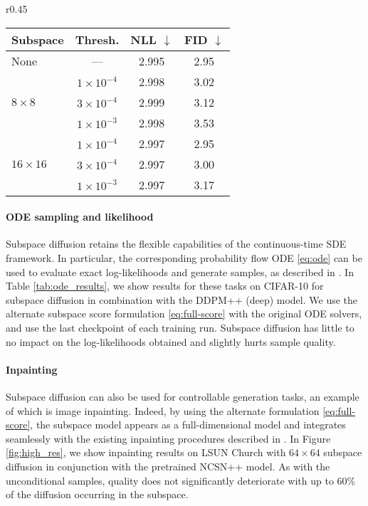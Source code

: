 \documentclass{article}
\begin{document}
\begin{wraptable}[13]{r}{0.45\textwidth}
    \vspace{-12pt}
    \small \begin{tabular}{lccc}
    \toprule
    Subspace               & Thresh. & NLL $\downarrow$   & FID $\downarrow$   \\ \midrule
    None & --- & 2.995 & 2.95 \\ \midrule
    \multirow{3}{*}{$8\times 8$} 
    & $1 \times 10^{-4}$ & 2.998 & 3.02 \\
    & $3 \times 10^{-4}$ & 2.999 & 3.12 \\
    & $1 \times 10^{-3}$ & 2.998 & 3.53 \\ \midrule
    \multirow{3}{*}{$16\times 16$} 
    & $1 \times 10^{-4}$ & 2.997 & 2.95 \\
    & $3 \times 10^{-4}$ & 2.997 & 3.00 \\
    & $1 \times 10^{-3}$ & 2.997 & 3.17 \\ \bottomrule
    \end{tabular}
    \caption{ODE sampling and NLL evaluation on CIFAR-10 from DDPM++ (deep) with subspace diffusion.}
    \label{tab:ode_results}
\end{wraptable}
\paragraph{\textbf{ODE sampling and likelihood}} Subspace diffusion retains the flexible capabilities of the continuous-time SDE framework. In particular, the corresponding probability flow ODE \eqref{eq:ode} can be used to evaluate exact log-likelihoods and generate samples, as described in \cite{song2021score}. In Table \ref{tab:ode_results}, we show results for these tasks on CIFAR-10 for subspace diffusion in combination with the DDPM++ (deep) model. We use the alternate subspace score formulation \eqref{eq:full-score} with the original ODE solvers, and use the last checkpoint of each training run. Subspace diffusion has little to no impact on the log-likelihoods obtained and slightly hurts sample quality.


\paragraph{\textbf{Inpainting}} Subspace diffusion can also be used for controllable generation tasks, an example of which is image inpainting. Indeed, by using the alternate formulation \eqref{eq:full-score}, the subspace model appears as a full-dimensional model and integrates seamlessly with the existing inpainting procedures described in \cite{song2021score}. In Figure \ref{fig:high_res}, we show inpainting results on LSUN Church with $64\times 64$ subspace diffusion in conjunction with the pretrained NCSN++ model. As with the unconditional samples, quality does not significantly deteriorate with up to 60\% of the diffusion occurring in the subspace.
\end{document}
